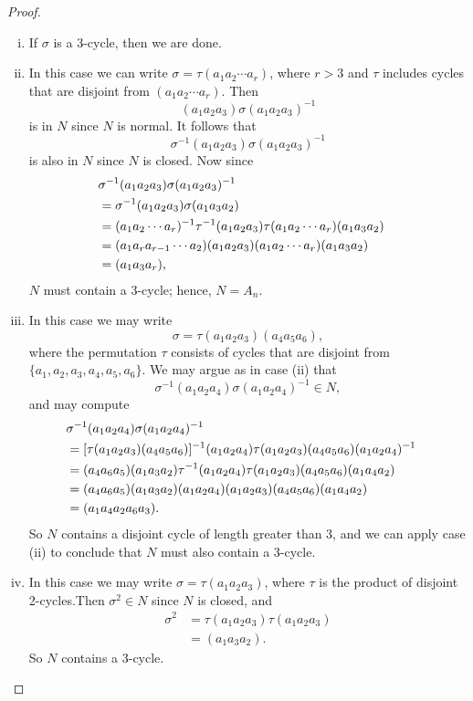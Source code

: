{\begin{proof}
\begin{enumerate}[(i)]
 \item
If $\sigma$ is a $3$-cycle, then we are done. 
\item
In this case we can write $\sigma = \tau(a_1 a_2 \cdots a_r)$, where $r>3$ 
and $\tau$ includes cycles that are disjoint from $(a_1 a_2 \cdots a_r)$.
Then   
\[
(a_1 a_2 a_3)\sigma(a_1 a_2 a_3)^{-1}
\]
is in $N$ since $N$ is normal. It follows that
\[
\sigma^{-1}(a_1 a_2 a_3)\sigma(a_1 a_2 a_3)^{-1}
\]
is also in $N$ since $N$ is closed. Now since
\begin{align*}
\lefteqn{\sigma^{-1}(a_1 a_2 a_3)\sigma(a_1 a_2 a_3)^{-1} } \\
& = \sigma^{-1}(a_1 a_2 a_3)\sigma(a_1 a_3 a_2) \\
& = (a_1 a_2 \cdots a_r)^{-1}\tau^{-1}(a_1 a_2 a_3) 
      \tau(a_1 a_2 \cdots a_r)(a_1 a_3 a_2) \\
& = (a_1 a_r a_{r-1} \cdots a_2 )(a_1 a_2 a_3) 
      (a_1 a_2 \cdots a_r)(a_1 a_3 a_2) \\
& = (a_1 a_3 a_r),
\end{align*}
$N$ must contain a 3-cycle; hence, $N = A_n$.
 
\item  
In this case we may write
\[
\sigma = \tau(a_1 a_2 a_3)(a_4 a_5 a_6),
\]
where the permutation $\tau$ consists of cycles that are disjoint from $\{a_1,a_2,a_3,a_4,a_5,a_6\}$.
We may argue as in case (ii) that
\[
\sigma^{-1}(a_1 a_2 a_4)\sigma(a_1 a_2 a_4)^{-1} \in N,
\]
and may compute
\begin{align*}
\lefteqn{\sigma^{-1}(a_1 a_2 a_4)\sigma(a_1 a_2 a_4)^{-1} } \\
& = [ \tau (a_1 a_2 a_3) (a_4 a_5 a_6) ]^{-1}  (a_1 a_2 a_4) 
      \tau (a_1 a_2 a_3) (a_4 a_5 a_6) (a_1 a_2 a_4)^{-1} \\
& = (a_4 a_6 a_5) (a_1 a_3 a_2) \tau^{-1}(a_1 a_2 a_4)  
      \tau (a_1 a_2 a_3) (a_4 a_5 a_6) (a_1 a_4 a_2) \\
& = (a_4 a_6 a_5)(a_1 a_3 a_2) (a_1 a_2 a_4)
      (a_1 a_2 a_3) (a_4 a_5 a_6)(a_1 a_4 a_2) \\
& = (a_1 a_4 a_2 a_6 a_3).
\end{align*}
So $N$ contains a disjoint cycle of length greater than 3, and we can
apply case (ii) to conclude that $N$ must also contain a 3-cycle. 
 
\item
In this case we may write $\sigma = \tau(a_1
a_2 a_3)$, where $\tau$ is the product of disjoint 2-cycles.Then $\sigma^2 \in N$ since $N$ is closed, and
\begin{align*}
\sigma^2
& = \tau(a_1 a_2 a_3)\tau(a_1 a_2 a_3) \\
& =(a_1 a_3 a_2).
\end{align*}
So $N$ contains a 3-cycle.
 

\end{enumerate}
\end{proof}}

